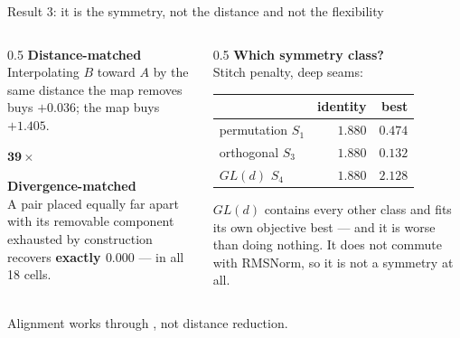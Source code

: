 \documentclass{beamer}
\begin{document}
\begin{frame}{Result 3: it is the symmetry, not the distance and not the flexibility}
  \begin{columns}[T]
    \begin{column}{0.5\textwidth}
      \textbf{Distance-matched}\\[0.3em]
      {\footnotesize Interpolating $B$ toward $A$ by the same distance the map removes buys
      $+0.036$; the map buys $\mathbf{+1.405}$.}
      \vspace{0.6em}
      \begin{center}\large $\mathbf{39\times}$\end{center}
      \vspace{0.6em}
      \textbf{Divergence-matched}\\[0.3em]
      {\footnotesize A pair placed equally far apart with its removable component exhausted by
      construction recovers \textbf{exactly $0.000$} --- in all 18 cells.}
    \end{column}
    \begin{column}{0.5\textwidth}
      \textbf{Which symmetry class?}\\[0.3em]
      {\footnotesize Stitch penalty, deep seams:}
      \begin{center}\footnotesize
      \begin{tabular}{lrr}
        \toprule
        & identity & best \\
        \midrule
        permutation $S_1$      & $1.880$ & $0.474$ \\
        orthogonal $S_3$       & $1.880$ & $\mathbf{0.132}$ \\
        $GL(d)$ $S_4$          & $1.880$ & $2.128$ \\
        \bottomrule
      \end{tabular}
      \end{center}
      {\footnotesize $GL(d)$ contains every other class and fits its own objective best --- and it
      is \alert{worse than doing nothing}. It does not commute with RMSNorm, so it is not a
      symmetry at all.}
    \end{column}
  \end{columns}
  \vfill
  \begin{block}{}
    \centering Alignment works through , not distance reduction.
  \end{block}
\end{frame}
\end{document}
